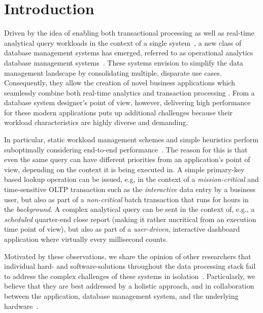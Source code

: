 \documentclass[11pt,dvipdfm]{article}
\begin{document}
\section{Introduction}
Driven by the idea of enabling both transactional processing as well as real-time analytical query workloads in the context of a single system~\cite{nollhrm19:Plattner:2009:ACA}, a new class of database management systems has emerged, referred to as operational analytics database management systems~\cite{nollhrm19:Boehm:2016:OAD}.
These systems envision to simplify the data management landscape by consolidating multiple, disparate use cases.
Consequently, they allow the creation of novel business applications which seamlessly combine both real-time analytics and transaction processing \cite{nollhrm19:Leukert:2015:TIR}.
From a database system designer's point of view, however, delivering high performance for these modern applications puts up additional challenges because their workload characteristics are highly diverse and demanding.

In particular, static workload management schemes and simple heuristics perform suboptimally considering end-to-end performance~\cite{nollhrm19:Wolf:2014:SUM}.
The reason for this is that even the same query can have different priorities from an application's point of view, depending on the context it is being executed in.
A simple primary-key based lookup operation can be issued, e.g, in the context of a \emph{mission-critical} and time-sensitive OLTP transaction such as the \emph{interactive} data entry by a business user, but also as part of a \emph{non-critical} batch transaction that runs for hours in the \emph{background}.
A complex analytical query can be sent in the context of, e.g., a \emph{scheduled} quarter-end close report (making it rather uncritical from an execution time point of view), but also as part of a \emph{user-driven}, interactive dashboard application where virtually every millisecond counts.

Motivated by these observations, we share the opinion of other researchers that individual hard- and software-solutions throughout the data processing stack fail to address the complex challenges of these systems in isolation~\cite{nollhrm19:Giceva:2013:COD, nollhrm19:Giceva:2017:COS}.
Particularly, we believe that they are best addressed by a holistic approach, and in collaboration between the application, database management system, and the underlying hardware~\cite{nollhrm19:Boehm:2015:NOT}.
\end{document}
